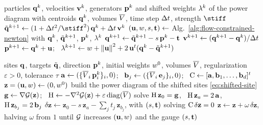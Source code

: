 \documentclass[main.tex]{subfiles}
\begin{document}
\begin{algorithm}[t]
  \caption{Time step of the constrained integrator (\S\ref{sec:flow-constrained}).}
  \label{alg:flow-constrained}
  \begin{algorithmic}[1]
    \Require particles $\mathbf{q}^k$, velocities $\mathbf{v}^k$, generators $\mathbf{p}^k$ and shifted weights $\lambda^k$ of the power diagram with centroids $\mathbf{q}^k$, volumes $\overline{V}$, time step $\Delta t$, strength $\stiff$
    \State $\pred^{k+1} \gets (1 + \tstep^2/\stiff^2)\,\qq^k + \tstep\,\vel^k$ 
    \State $(\mathbf{u}, w, s, \mathbf{t}) \gets$ Alg.~\ref{alg:flow-constrained-newton} with $\mathbf{q}^k$, $\tilde{\mathbf{q}}^{k+1}$, $\mathbf{p}^k$, $\lambda^k$
    \State $\mathbf{q}^{k+1} \gets \tilde{\mathbf{q}}^{k+1} - s\,\mathbf{p}^k - \mathbf{t}$ 
    \State $\mathbf{v}^{k+1} \gets (\mathbf{q}^{k+1} - \mathbf{q}^k) / \Delta t$
    \State $\mathbf{p}^{k+1} \gets \mathbf{q}^k + \mathbf{u}$; \ $\lambda^{k+1} \gets w + \left\lVert \mathbf{u} \right\rVert^2 + 2\,\mathbf{u}^{t} (\mathbf{q}^k - \tilde{\mathbf{q}}^{k+1})$ \Comment{\eqref{eq:shifted-site}}
  \end{algorithmic}
\end{algorithm}

\begin{algorithm}[t]
  \caption{Bordered Newton solve of \eqref{eq:flow-line-constraint} (Appendix~\ref{sec:appendix-bordered}).}
  \label{alg:flow-constrained-newton}
  \begin{algorithmic}[1]
    \Require sites $\mathbf{q}$, targets $\tilde{\mathbf{q}}$, direction $\mathbf{p}^k$, initial weights $w^0$, volumes $\overline{V}$, regularization $\varepsilon \!>\! 0$, tolerance $\tau$
    \State $\mathbf{a} \gets (\{\overline{V}_i\,\mathbf{p}^k_i\}_i, 0)$; \ $\mathbf{b}_j \gets (\{\overline{V}_i\,\mathbf{e}_j\}_i, 0)$; \ $\mathrm{C} \gets [\mathbf{a}, \mathbf{b}_1, \dots, \mathbf{b}_d]^{t}$ 
    \State $\mathbf{z} = (\mathbf{u}, w) \gets (0, w^0)$
    \Repeat
      \State build the power diagram of the shifted sites \eqref{eq:shifted-site}
      \State $\mathbf{g} \gets \nabla\mathcal{G}(\mathbf{z})$; \ $\mathrm{H} \gets -\nabla^2\mathcal{G}(\mathbf{z}) + \varepsilon\,\mathrm{diag}(\overline{V})$ 
      \State solve $\mathrm{H}\,\mathbf{z}_0 = \mathbf{g}$, \ $\mathrm{H}\,\mathbf{z}_a = 2\,\mathbf{a}$, \ $\mathrm{H}\,\mathbf{z}_{b_j} = 2\,\mathbf{b}_j$ 
      \State $\delta\mathbf{z} \gets \mathbf{z}_0 - s\,\mathbf{z}_a - \sum_j t_j\,\mathbf{z}_{b_j}$, with $(s, \mathbf{t})$ solving $\mathrm{C}\,\delta\mathbf{z} = 0$ 
      \State $\mathbf{z} \gets \mathbf{z} + \omega\,\delta\mathbf{z}$, halving $\omega$ from $1$ until $\mathcal{G}$ increases
    \State \Return $(\mathbf{u}, w)$ and the gauge $(s, \mathbf{t})$
  \end{algorithmic}
\end{algorithm}
\end{document}
